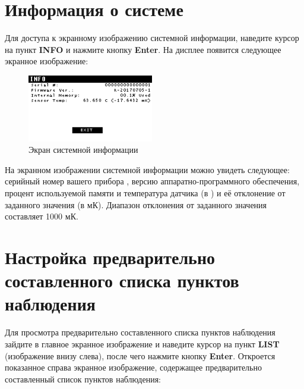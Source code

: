 \section{Информация о системе}

Для доступа к экранному изображению системной информации, наведите курсор на
пункт \textbf{INFO} и нажмите кнопку \textbf{Enter}. На дисплее появится
следующее экранное изображение:

\begin{figure}[H]
  \centering
  \includegraphics[width=0.49\textwidth]{figures/the_system_information_screen}
  \caption{Экран системной информации}
  \label{fig:the_system_information_screen}
\end{figure}

На экранном изображении системной информации можно увидеть следующее: серийный
номер вашего прибора \cg{}, версию аппаратно-программного обеспечения, процент
используемой памяти и температура датчика (в \textcelsius{}) и её отклонение от
заданного значения (в мК). Диапазон отклонения от заданного значения составляет
\textpm{}1000 мК.


\section[Настройка списка пунктов]{Настройка предварительно составленного списка пунктов наблюдения}
\label{sec:setting_up_the_pre-set_list_of_stations}

Для просмотра предварительно составленного списка пунктов наблюдения зайдите в
главное экранное изображение и наведите курсор на пункт \textbf{LIST}
(изображение внизу слева), после чего нажмите кнопку \textbf{Enter}. Откроется
показанное справа экранное изображение, содержащее предварительно составленный
список пунктов наблюдения:

